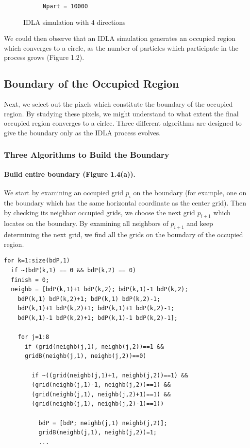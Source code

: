 \documentclass[letterpaper]{article}
\numberwithin{equation}{section} %
\numberwithin{figure}{section} %
\numberwithin{table}{section} %
\begin{document}
\begin{figure}[htbp]
\begin{subfigure}[b]{0.3\textwidth}
		\caption{\texttt{Npart = 10000}}
		\label{4direct_Npart10000_3suW11T}
	\end{subfigure}
	\caption{IDLA simulation with 4 directions}
	\label{IDLA simulation with 4 directions}
\end{figure}

\noindent
We could then observe that an IDLA simulation generates an occupied region which converges to a circle, as the number of particles which participate in the process grows (Figure 1.2).

\subsection{Boundary of the Occupied Region}
Next, we select out the pixels which constitute the boundary of the occupied region. By studying these pixels, we might understand to what extent the final occupied region converges to a cirlce. Three different algorithms are designed to give the boundary only as the IDLA process evolves.

\subsubsection{Three Algorithms to Build the Boundary}

\paragraph{Build entire boundary (Figure 1.4(a)).}
We start by examining an occupied grid $p_i$ on the boundary (for example, one on the boundary which has the same horizontal coordinate as the center grid). Then by checking its neighbor occupied grids, we choose the next grid $p_{i+1}$ which locates on the boundary. By examining all neighbors of $p_{i+1}$ and keep determining the next grid, we find all the grids on the boundary of the occupied region.

\begin{lstlisting}
for k=1:size(bdP,1)  
  if ~(bdP(k,1) == 0 && bdP(k,2) == 0)  
  finish = 0;
  neighb = [bdP(k,1)+1 bdP(k,2); bdP(k,1)-1 bdP(k,2); 
    bdP(k,1) bdP(k,2)+1; bdP(k,1) bdP(k,2)-1; 
    bdP(k,1)+1 bdP(k,2)+1; bdP(k,1)+1 bdP(k,2)-1; 
    bdP(k,1)-1 bdP(k,2)+1; bdP(k,1)-1 bdP(k,2)-1];

    for j=1:8
      if (grid(neighb(j,1), neighb(j,2))==1 && 
      gridB(neighb(j,1), neighb(j,2))==0)  

        if ~((grid(neighb(j,1)+1, neighb(j,2))==1) && 
        (grid(neighb(j,1)-1, neighb(j,2))==1) && 
        (grid(neighb(j,1), neighb(j,2)+1)==1) && 
        (grid(neighb(j,1), neighb(j,2)-1)==1)) 

          bdP = [bdP; neighb(j,1) neighb(j,2)];    
          gridB(neighb(j,1), neighb(j,2))=1;  
          ...
\end{lstlisting}
\end{document}
